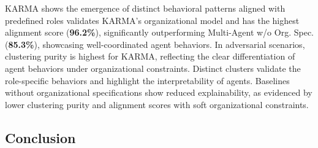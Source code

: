 KARMA shows the emergence of distinct behavioral patterns aligned with predefined roles validates KARMA's organizational model and has the highest alignment score (\textbf{96.2\%}), significantly outperforming Multi-Agent w/o Org. Spec. (\textbf{85.3\%}), showcasing well-coordinated agent behaviors. In adversarial scenarios, clustering purity is highest for KARMA, reflecting the clear differentiation of agent behaviors under organizational constraints.
%
Distinct clusters validate the role-specific behaviors and highlight the interpretability of agents. Baselines without organizational specifications show reduced explainability, as evidenced by lower clustering purity and alignment scores with soft organizational constraints.




\subsection{Conclusion}
\label{sec:conclusion}

